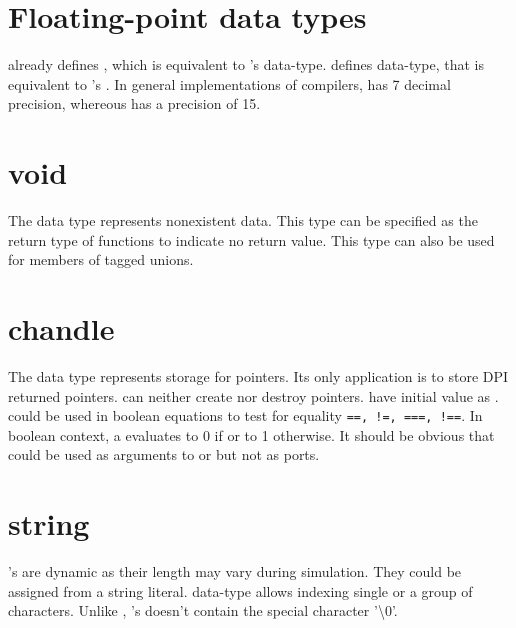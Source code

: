 \section{Floating-point data types}
\lvlog already defines \kwreal, which is equivalent to \lc's
 data-type. \lsvlog defines \kwshortreal data-type, that is
equivalent to \lc's . In general implementations of \lc
compilers,  has 7 decimal precision, whereous 
has a precision of 15.

\section{void}
The \kwvoid data type represents nonexistent data. This type can be
specified as the return type of functions to indicate no return
value. This type can also be used for members of tagged unions.

\section{chandle}
The \kwchandle data type represents storage for pointers. Its only
application is to store DPI returned pointers. \lsvlog can neither
create nor destroy \lc pointers. \kwchandle have initial value as
\kwnull. \kwchandle could be used in boolean equations to test for
equality \texttt{==, !=, ===, !==}. In boolean context, a \kwchandle
evaluates to 0 if \kwnull or to 1 otherwise. It should be obvious that
\kwchandle could be used as arguments to \kwfunction or \kwtask but
not as ports.

\section{string}
\lsvlog's \kwstring are dynamic as their length may vary during
simulation. They could be assigned from a string literal. \kwstring
data-type allows indexing single or a group of characters. Unlike \lc,
\lsvlog's \kwstring doesn't contain the special character
'\textbackslash{}0'.


